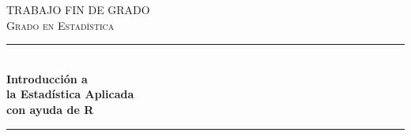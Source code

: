 \begin{titlepage}

\newcommand{\HRule}{\rule{\linewidth}{0.5mm}} %

\center %
 

\textsc{\LARGE TRABAJO FIN DE GRADO}\\[1.5cm] 
\textsc{\Large Grado en Estadística}\\[0.5cm] %


\HRule \\[0.4cm]
{ \huge \bfseries Introducción a \\[0.4\baselineskip]
la Estadística Aplicada\\[0.4\baselineskip] 
con ayuda de R}\\[0.4cm] %
\HRule \\[1.5cm]
 



\end{titlepage}
